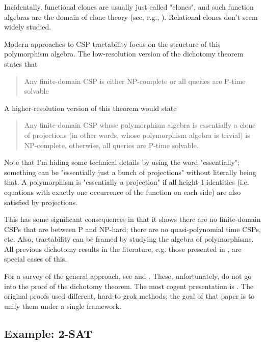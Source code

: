 \begin{remark}
Incidentally, functional clones are usually just called "clones", and such function algebras are the domain of clone theory (see, e.g., \citep{lau2006function}). Relational clones don't seem widely studied.
\end{remark}

Modern approaches to CSP tractability focus on the structure of this polymorphism algebra. The low-resolution version of the dichotomy theorem states that
\begin{quote}
    Any finite-domain CSP is either NP-complete or all queries are P-time solvable
\end{quote}

A higher-resolution version of this theorem would state

\begin{quote}
    Any finite-domain CSP whose polymorphism algebra is essentially a clone of projections (in other words, whose polymorphism algebra is trivial) is NP-complete, otherwise, all queries are P-time solvable.    
\end{quote}

\begin{remark}
Note that I’m hiding some technical details by using the word "essentially"; something can be "essentially just a bunch of projections" without literally being that. A polymorphism is "essentially a projection" if all height-1 identities (i.e. equations with exactly one occurrence of the function on each side) are also satisfied by projections.
\end{remark}

This has some significant consequences in that it shows there are no finite-domain CSPs that are between P and NP-hard; there are no quasi-polynomial time CSPs, etc. Also, tractability can be framed by studying the algebra of polymorphisms. All previous dichotomy results in the literature, e.g. those presented in \citep{grohe2006structure}, are special cases of this.

For a survey of the general approach, see \citep{brady2022notes} and \citep{barto2017polymorphisms}. These, unfortunately, do not go into the proof of the dichotomy theorem. The most cogent presentation is \citep{barto2021minimal}. The original proofs used different, hard-to-grok methods; the goal of that paper is to unify them under a single framework.

\subsection{Example: 2-SAT}\label{sec:2-sat-example}

